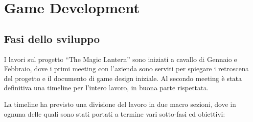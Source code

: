 \chapter{Game Development}
\label{chap:game_development}

\section{Fasi dello sviluppo}

I lavori sul progetto ``The Magic Lantern'' sono iniziati a cavallo di Gennaio e Febbraio, dove i primi meeting con l'azienda sono serviti per spiegare i retroscena del progetto e il documento di game design iniziale.
Al secondo meeting è stata definitiva una timeline per l'intero lavoro, in buona parte rispettata. 

La timeline ha previsto una divisione del lavoro in due macro sezioni, dove in ognuna delle quali sono stati portati a termine vari sotto-fasi ed obiettivi:

